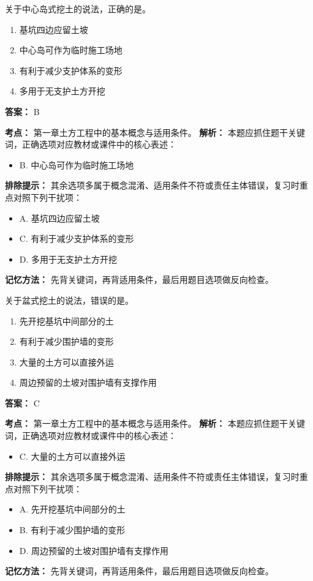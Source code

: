 \documentclass[UTF8,fontset=fandol,11pt]{ctexart}
\begin{document}
\begin{quizbox}[title={第 12 题}]
关于中心岛式挖土的说法，正确的是。\\
\begin{enumerate}[label=\Alph*.]
\item 基坑四边应留土坡
\item 中心岛可作为临时施工场地
\item 有利于减少支护体系的变形
\item 多用于无支护土方开挖
\end{enumerate}
\textbf{答案：} B
\vspace{0.25em}
\begin{answerbox}[title={考点解析}]
\textbf{考点：} 第一章土方工程中的基本概念与适用条件。
\textbf{解析：} 本题应抓住题干关键词，正确选项对应教材或课件中的核心表述：
\begin{itemize}
\item B. 中心岛可作为临时施工场地
\end{itemize}
\textbf{排除提示：} 其余选项多属于概念混淆、适用条件不符或责任主体错误，复习时重点对照下列干扰项：
\begin{itemize}
\item A. 基坑四边应留土坡
\item C. 有利于减少支护体系的变形
\item D. 多用于无支护土方开挖
\end{itemize}
\textbf{记忆方法：} 先背关键词，再背适用条件，最后用题目选项做反向检查。
\end{answerbox}
\end{quizbox}

\begin{quizbox}[title={第 13 题}]
关于盆式挖土的说法，错误的是。\\
\begin{enumerate}[label=\Alph*.]
\item 先开挖基坑中间部分的土
\item 有利于减少围护墙的变形
\item 大量的土方可以直接外运
\item 周边预留的土坡对围护墙有支撑作用
\end{enumerate}
\textbf{答案：} C
\vspace{0.25em}
\begin{answerbox}[title={考点解析}]
\textbf{考点：} 第一章土方工程中的基本概念与适用条件。
\textbf{解析：} 本题应抓住题干关键词，正确选项对应教材或课件中的核心表述：
\begin{itemize}
\item C. 大量的土方可以直接外运
\end{itemize}
\textbf{排除提示：} 其余选项多属于概念混淆、适用条件不符或责任主体错误，复习时重点对照下列干扰项：
\begin{itemize}
\item A. 先开挖基坑中间部分的土
\item B. 有利于减少围护墙的变形
\item D. 周边预留的土坡对围护墙有支撑作用
\end{itemize}
\textbf{记忆方法：} 先背关键词，再背适用条件，最后用题目选项做反向检查。
\end{answerbox}
\end{quizbox}
\end{document}
